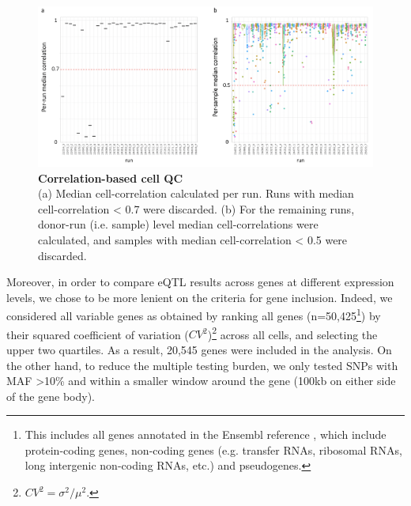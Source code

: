\begin{figure}[h]
\centering
\includegraphics[width=15cm]{Chapter3/Fig/sc_eqtl_cell_QC.png}
\caption[Correlation-based cell QC]{\textbf{Correlation-based cell QC}\\
(a) Median cell-correlation calculated per run.
Runs with median cell-correlation < 0.7 were discarded.
(b) For the remaining runs, donor-run (i.e. sample) level median cell-correlations were calculated, and samples with median cell-correlation < 0.5 were discarded.}
\label{fig:sc_eqtl_autocorrelation}
\end{figure}


Moreover, in order to compare eQTL results across genes at different expression levels, we chose to be more lenient on the criteria for gene inclusion.
Indeed, we considered all variable genes as obtained by ranking all genes (n=50,425\footnote{This includes all genes annotated in the Ensembl reference \cite{yates2020ensembl}, which include protein-coding genes, non-coding genes (e.g. transfer RNAs, ribosomal RNAs, long intergenic non-coding RNAs, etc.) and pseudogenes.}) by their squared coefficient of variation ($CV^2$)\footnote{$CV^2=\sigma^2/\mu^2$.} across all cells, and selecting the upper two quartiles.
As a result, 20,545 genes were included in the analysis. 
On the other hand, to reduce the multiple testing burden, we only tested SNPs with MAF >10\% and within a smaller window around the gene (100kb on either side of the gene body).



